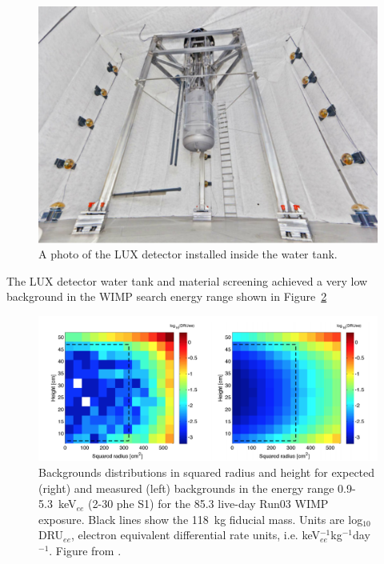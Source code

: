 \begin{figure}[htbp]
\begin{center}
\includegraphics[width=\textwidth]{figures/lux/lux_watertank.png}
\caption{A photo of the LUX detector installed inside the water tank.}
\label{fig:luxwatertank}
\end{center}
\end{figure}

The \ac{LUX} detector water tank and material screening achieved a very low background in the \ac{WIMP} search energy range shown in Figure~\ref{fig:luxrun03bkg}

\begin{figure}[htbp]
\begin{center}
\includegraphics[width=\textwidth]{figures/lux/lux_run03bkg.png}
\caption{Backgrounds distributions in squared radius and height for expected (right) and measured (left) backgrounds in the energy range 0.9-5.3~keV$_{ee}$ (2-30 phe S1) for the 85.3 live-day Run03 \ac{WIMP} exposure. Black lines show the 118~kg fiducial mass. Units are log$_{10}$DRU$_{ee}$, electron equivalent differential rate units, i.e. keV$_{ee}^{-1}$kg$^{-1}$day$^{-1}$.  Figure from \cite{LUXRun03Backgrounds}. }
\label{fig:luxrun03bkg}
\end{center}
\end{figure}


